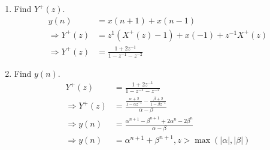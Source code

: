 \documentclass[journal,12pt,twocolumn]{IEEEtran}
\renewcommand\thesection{\arabic{section}}
\begin{document}
\begin{enumerate}[label=\thesection.\arabic*,ref=\thesection.\theenumi]
\begin{figure}[!ht]
\begin{center}
	\end{center}
	\label{fig:xnyn}	
	\end{figure}
	\item Find $Y^{+}(z)$.\\
	\solution
	\begin{align}
		y(n)&=x(n+1)+x(n-1)\\
		\Rightarrow Y^{+}(z)&=z^{1}(X^{+}(z)-1)+x(-1)+z^{-1}X^{+}(z)\\
        \Rightarrow	Y^{+}(z)&=\frac{1+2z^{-1}}{1-z^{-1}-z^{-2}}
	\end{align}
\item Find $y(n)$.\\
\solution
\begin{align}
	Y^{+}(z)&=\frac{1+2z^{-1}}{1-z^{-1}-z^{-2}}\\
	\Rightarrow Y^{+}(z)&=\frac{\frac{\alpha+2}{1-\alpha z^{-1}}-\frac{\beta+2}{1-\beta z^{-1}}}{\alpha-\beta}\\
	\Rightarrow y(n)&=\frac{\alpha^{n+1}-\beta^{n+1}+2\alpha^{n}-2\beta^{n}}{\alpha-\beta}\\
	\Rightarrow y(n)&=\alpha^{n+1}+\beta^{n+1},z> \max(|\alpha|,|\beta|)
\end{align}
\end{enumerate}
\end{document}
